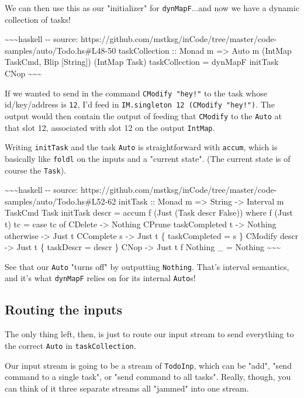 \documentclass[]{article}
\begin{document}
We can then use this as our "initializer" for \texttt{dynMapF}...and now we have
a dynamic collection of tasks!

\textasciitilde{}\textasciitilde{}\textasciitilde{}haskell -\/- source:
https://github.com/mstksg/inCode/tree/master/code-samples/auto/Todo.hs\#L48-50
taskCollection :: Monad m =\textgreater{} Auto m (IntMap TaskCmd, Blip
{[}String{]}) (IntMap Task) taskCollection = dynMapF initTask CNop
\textasciitilde{}\textasciitilde{}\textasciitilde{}

If we wanted to send in the command \texttt{CModify\ "hey!"} to the task whose
id/key/address is \texttt{12}, I'd feed in
\texttt{IM.singleton\ 12\ (CModify\ "hey!")}. The output would then contain the
output of feeding that \texttt{CModify} to the \texttt{Auto} at that slot 12,
associated with slot 12 on the output \texttt{IntMap}.

Writing \texttt{initTask} and the task \texttt{Auto} is straightforward with
\texttt{accum}, which is basically like \texttt{foldl} on the inputs and a
"current state". (The current state is of course the \texttt{Task}).

\textasciitilde{}\textasciitilde{}\textasciitilde{}haskell -\/- source:
https://github.com/mstksg/inCode/tree/master/code-samples/auto/Todo.hs\#L52-62
initTask :: Monad m =\textgreater{} String -\textgreater{} Interval m TaskCmd
Task initTask descr = accum f (Just (Task descr False)) where f (Just t) tc =
case tc of CDelete -\textgreater{} Nothing CPrune \textbar{} taskCompleted t
-\textgreater{} Nothing \textbar{} otherwise -\textgreater{} Just t CComplete s
-\textgreater{} Just t \{ taskCompleted = s \} CModify descr -\textgreater{}
Just t \{ taskDescr = descr \} CNop -\textgreater{} Just t f Nothing \_ =
Nothing \textasciitilde{}\textasciitilde{}\textasciitilde{}

See that our \texttt{Auto} "turns off" by outputting \texttt{Nothing}. That's
interval semantics, and it's what \texttt{dynMapF} relies on for its internal
\texttt{Auto}s!

\subsection{Routing the inputs}

The only thing left, then, is just to route our input stream to send everything
to the correct \texttt{Auto} in \texttt{taskCollection}.

Our input stream is going to be a stream of \texttt{TodoInp}, which can be
"add", "send command to a single task", or "send command to all tasks". Really,
though, you can think of it three separate streams all "jammed" into one stream.
\end{document}
